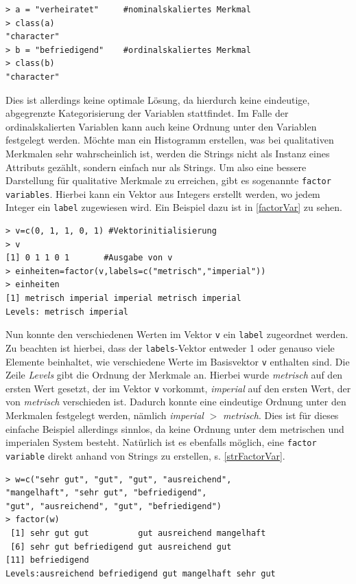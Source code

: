 \documentclass[a4paper, 12pt]{report} %
\begin{document}
\lstset{language=R}
\begin{lstlisting}[frame=single,caption={Deklarierung einer qualitativen Variable a}]
> a = "verheiratet"     #nominalskaliertes Merkmal
> class(a)
"character"
> b = "befriedigend"	#ordinalskaliertes Merkmal
> class(b)
"character"
\end{lstlisting}
\label{characterVar}

Dies ist allerdings keine optimale Lösung, da hierdurch keine eindeutige, abgegrenzte Kategorisierung der Variablen stattfindet. Im Falle der ordinalskalierten Variablen kann auch keine Ordnung unter den Variablen festgelegt werden. Möchte man ein Histogramm erstellen, was bei qualitativen Merkmalen sehr wahrscheinlich ist, werden die Strings nicht als Instanz eines Attributs gezählt, sondern einfach nur als Strings. Um also eine bessere Darstellung für qualitative Merkmale zu erreichen, gibt es sogenannte \texttt{factor variables}. Hierbei kann ein Vektor aus Integers erstellt werden, wo jedem Integer ein \texttt{label} zugewiesen wird. Ein Beispiel dazu ist in \ref{factorVar} zu sehen. 

\lstset{language=R}
\begin{lstlisting}[frame=single,caption={Erstellung einer \texttt{factor variable}}]
> v=c(0, 1, 1, 0, 1) #Vektorinitialisierung
> v
[1] 0 1 1 0 1		#Ausgabe von v
> einheiten=factor(v,labels=c("metrisch","imperial"))
> einheiten 
[1] metrisch imperial imperial metrisch imperial
Levels: metrisch imperial
\end{lstlisting}
\label{factorVar}

Nun konnte den verschiedenen Werten im Vektor \texttt{v} ein \texttt{label} zugeordnet werden. Zu beachten ist hierbei, dass der \texttt{labels}-Vektor entweder 1 oder genauso viele Elemente beinhaltet, wie verschiedene Werte im Basisvektor \texttt{v} enthalten sind. Die Zeile \textit{Levels} gibt die Ordnung der Merkmale an. Hierbei wurde \textit{metrisch} auf den ersten Wert gesetzt, der im Vektor \texttt{v} vorkommt, \textit{imperial} auf den ersten Wert, der von \textit{metrisch} verschieden ist. Dadurch konnte eine eindeutige Ordnung unter den Merkmalen festgelegt werden, nämlich \textit{imperial} $>$ \textit{metrisch}. Dies ist für dieses einfache Beispiel allerdings sinnlos, da keine Ordnung unter dem metrischen und imperialen System besteht.  Natürlich ist es ebenfalls möglich, eine \texttt{factor variable} direkt anhand von Strings zu erstellen, s. \ref{strFactorVar}.

\lstset{language=R}
\begin{lstlisting}[frame=single,caption={Erstellung einer \texttt{factor Variable} mit Strings}]
> w=c("sehr gut", "gut", "gut", "ausreichend", 
"mangelhaft", "sehr gut", "befriedigend", 
"gut", "ausreichend", "gut", "befriedigend")
> factor(w)
 [1] sehr gut gut          gut ausreichend mangelhaft  
 [6] sehr gut befriedigend gut ausreichend gut         
[11] befriedigend
Levels:ausreichend befriedigend gut mangelhaft sehr gut
\end{lstlisting}
\label{strFactorVar}
\end{document}
